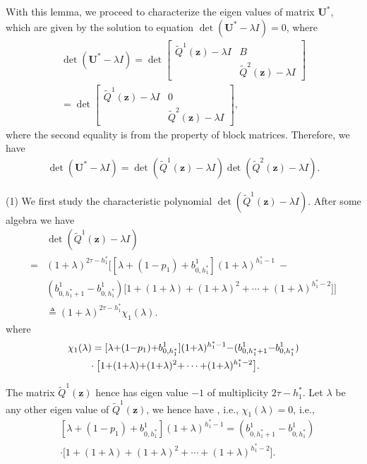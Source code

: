 \documentclass[11pt,twocolumn]{IEEEtran}
\begin{document}
With this lemma, we proceed to characterize the eigen values of matrix $\bm U^*$, which are given by the solution to equation $\det(\bm U^*-\lambda I)=0$, where
\begin{align}
\det(\bm U^*-\lambda I )=\det \begin{bmatrix}\tilde{Q}^1(\bm z)-\lambda I &  B \\
& \tilde{Q}^2(\bm z)-\lambda I
\end{bmatrix}\nonumber\\
=\det\begin{bmatrix}\tilde{Q}^1(\bm z)-\lambda I & 0 \\
& \tilde{Q}^2(\bm z)-\lambda I
\end{bmatrix}, \nonumber
\end{align}
where the second equality is from the property of block matrices. Therefore, we have
\begin{align}
\nonumber
\det(\bm U^*-\lambda I )= \det (\tilde{Q}^1(\bm z)-\lambda I)\det(\tilde{Q}^2(\bm z)-\lambda I).
\end{align}

(1) We first study the characteristic polynomial $\det (\tilde{Q}^1(\bm z)-\lambda I)$. After some algebra we have
\begin{align}
&\det (\tilde{Q}^1(\bm z)-\lambda I)\nonumber\\
=&(1+\lambda)^{2\tau-h^*_1} \Big[[\lambda+(1{-}p_1){+}b_{0,h^*_1}^1](1+\lambda)^{h^*_1-1}\ - \nonumber \\ &(b_{0,h^*_1{+}1}^1{-}b_{0,h^*_1}^1)\big[1{+}(1{+}\lambda){+}(1{+}\lambda)^2{+}\cdots{+}(1{+}\lambda)^{h^*_1-2} \big]\Big] \nonumber \\
&\triangleq (1+\lambda)^{2\tau-h^*_1} \chi_1(\lambda). \nonumber
\end{align}
where
\begin{align}
\nonumber
&\chi_1(\lambda)=[\lambda{+}(1{-}p_1){+}b_{0,h^*_1}^1](1{+}\lambda)^{h^*_1{-}1}{-} (b_{0,h^*_1{+}1}^1{-}b_{0,h^*_1}^1)\nonumber\\
&\hspace{0.3in}\cdot\big[1{+}(1{+}\lambda){+}(1{+}\lambda)^2{+}\cdots{+}(1{+}\lambda)^{h^*_1{-}2} \big].
\end{align}

The matrix $\tilde{Q}^1(\bm z)$ hence has eigen value $-1$ of multiplicity $2\tau-h^*_1$. Let $\lambda$ be any other eigen value of $\tilde{Q}^1(\bm z)$, we hence have , i.e., $\chi_1(\lambda)=0$, i.e.,
\begin{align}
\label{eq:g01}
&[\lambda{+}(1{-}p_1){+}b_{0,h^*_1}^1](1{+}\lambda)^{h^*_1{-}1}= (b_{0,h^*_1{+}1}^1{-}b_{0,h^*_1}^1)\nonumber\\
&\cdot\big[1{+}(1{+}\lambda){+}(1{+}\lambda)^2{+}\cdots{+}(1{+}\lambda)^{h^*_1{-}2} \big].
\end{align}
\end{document}
